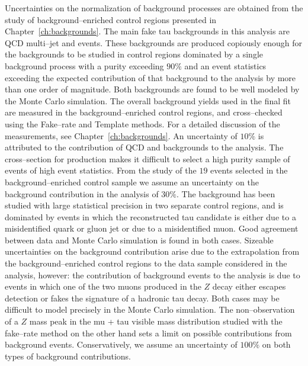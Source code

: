 Uncertainties on the normalization of background processes are obtained from the
study of background--enriched control regions presented in
Chapter~\ref{ch:backgrounds}.  The main fake tau backgrounds in this analysis
are QCD multi--jet and \WpJets events.  These backgrounds are produced copiously
enough for the backgrounds to be studied in control regions dominated by a
single background process with a purity exceeding $90\%$ and an event statistics
exceeding the expected contribution of that background to the analysis by more
than one order of magnitude.  Both backgrounds are found to be well modeled by
the Monte Carlo simulation. The overall background yields used in the final fit
are measured in the background--enriched control regions, and cross--checked
using the Fake--rate and Template methods. For a detailed discussion of the
measurements, see Chapter~\ref{ch:backgrounds}.  An uncertainty of $10\%$ is
attributed to the contribution of QCD and \WpJets backgrounds to the analysis.
The cross--section for \ttbarpJets production makes it difficult to select a
high purity sample of \ttbarpJets events of high event statistics.  From the
study of the $19$ events selected in the \ttbarpJets background--enriched control
sample we assume an uncertainty on the \ttbarpJets background contribution in
the analysis of $30\%$.  The \ZMM background has been studied with large
statistical precision in two separate control regions, and is dominated by
events in which the reconstructed tau candidate is either due to a
misidentified quark or gluon jet or due to a misidentified muon.  Good agreement
between data and Monte Carlo simulation is found in both cases.  Sizeable
uncertainties on the \ZMM background contribution arise due to the extrapolation
from the background--enriched control regions to the data sample considered in
the analysis, however: the contribution of \ZMM background events to the
analysis is due to events in which one of the two muons produced in the $Z$
decay either escapes detection or fakes the signature of a hadronic tau decay.
Both cases may be difficult to model precisely in the Monte Carlo simulation.
The non--observation of a $Z$ mass peak in the mu + tau visible mass
distribution studied with the fake--rate method on the other hand sets a limit
on possible contributions from \ZMM background events.  Conservatively, we
assume an uncertainty of $100\%$ on both types of \ZMM background contributions.

